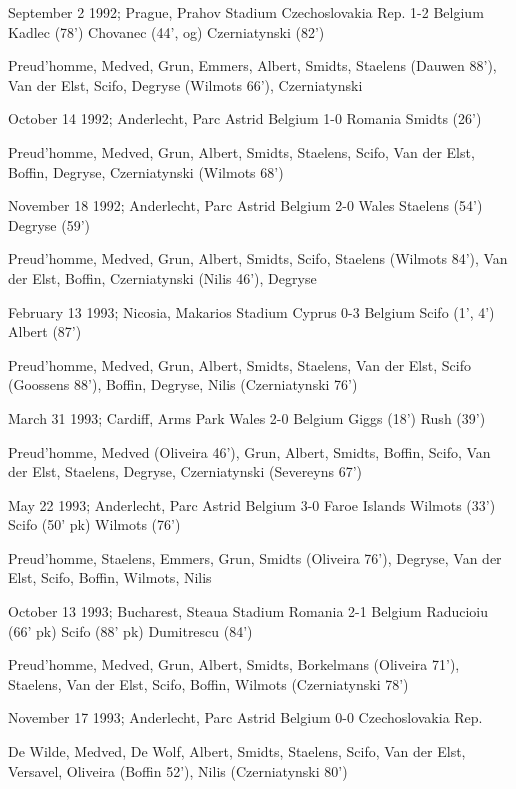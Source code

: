 September 2 1992; Prague, Prahov Stadium
Czechoslovakia Rep. 1-2      Belgium 
Kadlec (78')  Chovanec (44', og) Czerniatynski (82')

Preud'homme, Medved, Grun, Emmers, Albert, Smidts, Staelens (Dauwen 88'), 
Van der Elst, Scifo, Degryse (Wilmots 66'), Czerniatynski

October 14 1992; Anderlecht, Parc Astrid
Belgium 1-0      Romania
Smidts (26')

Preud'homme, Medved, Grun, Albert, Smidts, Staelens, Scifo, Van der Elst, 
Boffin, Degryse, Czerniatynski (Wilmots 68')

November 18 1992; Anderlecht, Parc Astrid
Belgium         2-0      Wales 
Staelens (54')
Degryse (59')

Preud'homme, Medved, Grun, Albert, Smidts, Scifo, Staelens (Wilmots 84'), 
Van der Elst, Boffin, Czerniatynski (Nilis 46'), Degryse

February 13 1993; Nicosia, Makarios Stadium
Cyprus          0-3      Belgium 
           Scifo (1', 4')
           Albert (87')
        
Preud'homme, Medved, Grun, Albert, Smidts, Staelens, Van der Elst, 
Scifo (Goossens 88'), Boffin, Degryse, Nilis (Czerniatynski 76')

March 31 1993; Cardiff, Arms Park
Wales    2-0      Belgium 
Giggs (18')
Rush (39')

Preud'homme, Medved (Oliveira 46'), Grun, Albert, Smidts, Boffin, Scifo, 
Van der Elst, Staelens, Degryse, Czerniatynski (Severeyns 67')

May 22 1993; Anderlecht, Parc Astrid
Belgium         3-0      Faroe Islands
Wilmots (33')
Scifo (50' pk)
Wilmots (76')

Preud'homme, Staelens, Emmers, Grun, Smidts (Oliveira 76'), Degryse, 
Van der Elst, Scifo, Boffin, Wilmots, Nilis

October 13 1993; Bucharest, Steaua Stadium
Romania         2-1      Belgium  
Raducioiu (66' pk)       Scifo (88' pk)
Dumitrescu (84')         

Preud'homme, Medved, Grun, Albert, Smidts, Borkelmans (Oliveira 71'), Staelens, 
Van der Elst, Scifo, Boffin, Wilmots (Czerniatynski 78')

November 17 1993; Anderlecht, Parc Astrid
Belgium         0-0      Czechoslovakia Rep.

De Wilde, Medved, De Wolf, Albert, Smidts, Staelens, Scifo, Van der Elst, 
Versavel, Oliveira (Boffin 52'), Nilis (Czerniatynski 80')
